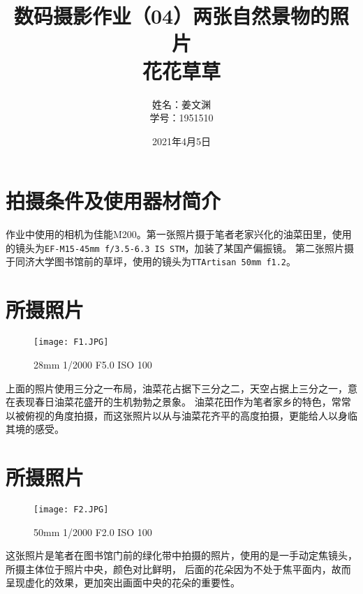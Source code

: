 \documentclass[cn,black,9pt,normal]{elegantnote}
\title{数码摄影作业（04）两张自然景物的照片\\\small{花花草草}}
\author{姓名：姜文渊\\学号：1951510}
\date{2021年4月5日}
\begin{document}
\maketitle


\section*{拍摄条件及使用器材简介}

作业中使用的相机为佳能M200。第一张照片摄于笔者老家兴化的油菜田里，使用的镜头为\texttt{EF-M15-45mm f/3.5-6.3 IS STM}，加装了某国产偏振镜。
第二张照片摄于同济大学图书馆前的草坪，使用的镜头为\texttt{TTArtisan 50mm f1.2}。

\section{所摄照片}
\begin{figure}[H]
    \centering
    \texttt{[image: F1.JPG]}
    \caption{28mm 1/2000 F5.0 ISO 100}
    \label{F-01}
\end{figure}

上面的照片使用三分之一布局，油菜花占据下三分之二，天空占据上三分之一，意在表现春日油菜花盛开的生机勃勃之景象。
油菜花田作为笔者家乡的特色，常常以被俯视的角度拍摄，而这张照片以从与油菜花齐平的高度拍摄，更能给人以身临其境的感受。

\section{所摄照片}
\begin{figure}[H]
    \centering
    \texttt{[image: F2.JPG]}
    \caption{50mm 1/2000 F2.0 ISO 100}
    \label{F-02}
\end{figure}

这张照片是笔者在图书馆门前的绿化带中拍摄的照片，使用的是一手动定焦镜头，所摄主体位于照片中央，颜色对比鲜明，
后面的花朵因为不处于焦平面内，故而呈现虚化的效果，更加突出画面中央的花朵的重要性。
\end{document}

